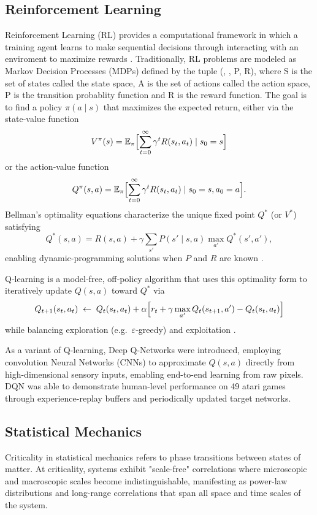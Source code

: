 \subsection{Reinforcement Learning}

Reinforcement Learning (RL) provides a computational framework in which a training agent learns to make sequential decisions through interacting with an enviroment to maximize rewards \cite{mnih2013playingatarideepreinforcement}.
Traditionally, RL problems are modeled as Markov Decision Processes (MDPs) defined by the tuple (, , P, R), where S is the set of states called the state space, A is the set of actions called the action space, P is the transition probablity function and R is the reward function\cite{Sutton1998}.
The goal is to find a policy \(\pi(a\!\mid\!s)\) that maximizes the expected return, either via the state‑value function
\[
V^\pi(s) = \mathbb{E}_\pi\Bigl[\sum_{t=0}^\infty \gamma^t R(s_t,a_t)\mid s_0 = s\Bigr]
\]
or the action‑value function
\[
Q^\pi(s,a) = \mathbb{E}_\pi\Bigl[\sum_{t=0}^\infty \gamma^t R(s_t,a_t)\mid s_0 = s,a_0 = a\Bigr].
\]
Bellman’s optimality equations characterize the unique fixed point \(Q^*\) (or \(V^*\)) satisfying
\[
Q^*(s,a) = R(s,a) + \gamma \sum_{s'} P(s'\!\mid\!s,a)\max_{a'} Q^*(s',a'),
\]
enabling dynamic‑programming solutions when \(P\) and \(R\) are known \cite{bellman1962applied}.

Q‑learning is a model‑free, off‑policy algorithm that uses this optimality form to iteratively update \(Q(s,a)\) toward \(Q^*\) via
\[
Q_{t+1}(s_t,a_t)\;\leftarrow\;Q_t(s_t,a_t)
+ \alpha\Bigl[r_t + \gamma \max_{a'}Q_t(s_{t+1},a') - Q_t(s_t,a_t)\Bigr]
\]
while balancing exploration (e.g.\ \(\varepsilon\)‑greedy) and exploitation \cite{watkins1992q}.  

As a variant of Q-learning, Deep Q-Networks\cite{mnih2013playingatarideepreinforcement} were introduced, employing convolution Neural Networks (CNNs) to approximate \(Q(s,a)\) directly from high-dimensional sensory inputs, emabling end-to-end learning from raw pixels.
DQN was able to demonstrate human-level performance on 49 atari games through experience-replay buffers and periodically updated target networks\cite{mnih2015humanlevel}.

\subsection{Statistical Mechanics}

Criticality in statistical mechanics refers to phase transitions between states of matter. At criticality, systems exhibit "scale-free" correlations where microscopic and macroscopic scales become indistinguishable, manifesting as power-law distributions and long-range correlations that span all space and time scales of the system.


